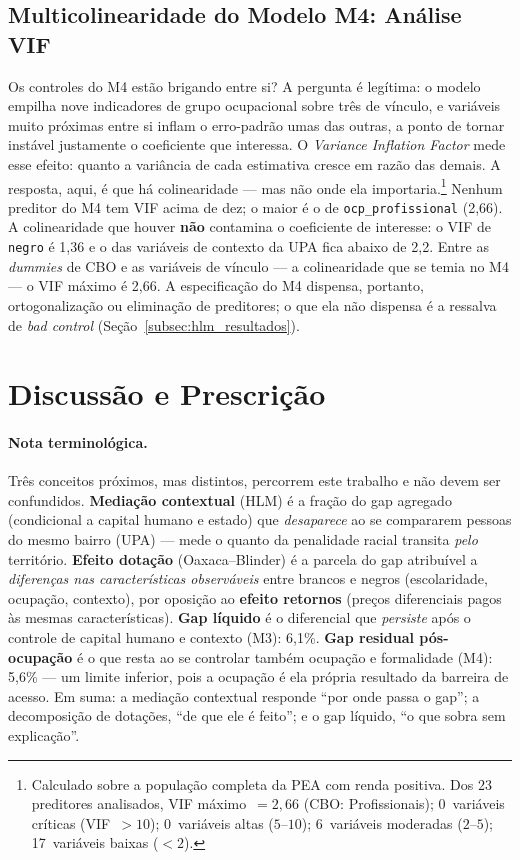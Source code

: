 \documentclass[12pt, a4paper, oneside]{article}
\let\oldsubsectionFB\subsection
\renewcommand{\subsection}{\FloatBarrier\oldsubsectionFB}
\begin{document}
\subsection{Multicolinearidade do Modelo M4: Análise VIF}
\label{subsec:vif}

Os controles do M4 estão brigando entre si? A pergunta é legítima: o modelo empilha nove indicadores de grupo ocupacional sobre três de vínculo, e variáveis muito próximas entre si inflam o erro-padrão umas das outras, a ponto de tornar instável justamente o coeficiente que interessa. O \textit{Variance Inflation Factor} mede esse efeito: quanto a variância de cada estimativa cresce em razão das demais. A resposta, aqui, é que há colinearidade --- mas não onde ela importaria.\footnote{Calculado sobre a população completa da PEA com renda positiva. Dos $23$ preditores analisados, VIF máximo~$= 2,66$
(CBO: Profissionais); 0~variáveis críticas
(VIF~$> 10$); 0~variáveis altas ($5$--$10$);
6~variáveis moderadas ($2$--$5$);
17~variáveis baixas ($< 2$).}
Nenhum preditor do M4 tem VIF acima de dez; o maior é o de \texttt{ocp\_profissional} (2,66). A colinearidade que houver \textbf{não} contamina o coeficiente de
interesse: o VIF de
\texttt{negro} é 1,36 e o das variáveis de contexto da UPA fica abaixo de
2,2. Entre as \textit{dummies} de CBO e as variáveis de vínculo --- a
colinearidade que se temia no M4 --- o VIF máximo é 2,66. A especificação
do M4 dispensa, portanto, ortogonalização ou eliminação de preditores; o que ela
não dispensa é a ressalva de \emph{bad control} (Seção~\ref{subsec:hlm_resultados}).

\section{Discussão e Prescrição}
\label{sec:discussao}

\paragraph{Nota terminológica.}
Três conceitos próximos, mas distintos, percorrem este trabalho e não devem ser
confundidos. \textbf{Mediação contextual} (HLM) é a fração do gap agregado
(condicional a capital humano e estado) que \textit{desaparece} ao se compararem
pessoas do mesmo bairro (UPA) --- mede o quanto da penalidade racial transita
\textit{pelo} território.
\textbf{Efeito dotação} (Oaxaca--Blinder) é a parcela do gap atribuível a
\textit{diferenças nas características observáveis} entre brancos e negros
(escolaridade, ocupação, contexto), por oposição ao \textbf{efeito retornos}
(preços diferenciais pagos às mesmas características).
\textbf{Gap líquido} é o diferencial que \textit{persiste} após o controle de
capital humano e contexto (M3): 6,1\%. \textbf{Gap residual pós-ocupação} é o
que resta ao se controlar também ocupação e formalidade (M4): 5,6\% --- um limite
inferior, pois a ocupação é ela própria resultado da barreira de acesso. Em suma: a mediação contextual responde
``por onde passa o gap''; a decomposição de dotações, ``de que ele é feito''; e o
gap líquido, ``o que sobra sem explicação''.
\end{document}
